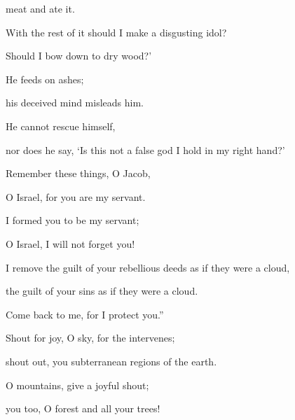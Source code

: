 {meat
and ate
it.
\par }{\Q With the rest
of it should I make
a disgusting
idol?
\par }{\Q Should I bow down
to dry wood?’
\par }{\Q {}He feeds
on ashes;
\par }{\Q his deceived
mind
misleads
him.
\par }{\Q He cannot
rescue
himself,
\par }{\Q nor
does he say,
‘Is this not
a false
god I hold in my right hand?’
\par }{\Q {}Remember
these
things, O Jacob,
\par }{\Q O Israel,
for
you are my servant.
\par }{\Q I formed
you to be my servant;
\par }{\Q O
Israel,
I will not
forget you!
\par }{\Q {}I remove
the guilt
of your rebellious
deeds as if they were a cloud,
\par }{\Q the guilt of your sins
as if they were a cloud.

\par }{\Q Come back
to me,
for
I protect you.”
\par }{\Q {}Shout
for joy, O sky,
for
the
{}
intervenes;
\par }{\Q shout
out, you subterranean
regions of the earth.
\par }{\Q O mountains,
give a joyful
shout;
\par }{\Q you too, O forest
and all
your trees!

}
